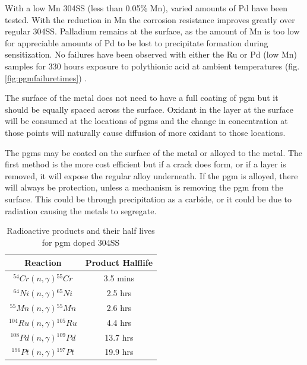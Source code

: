 With a low Mn 304SS (less than 0.05\% Mn), varied amounts of Pd have been tested.  With the reduction in Mn the corrosion resistance improves greatly over regular 304SS.  Palladium remains at the surface, as the amount of Mn is too low for appreciable amounts of Pd to be lost to precipitate formation during sensitization.  No failures have been observed with either the Ru or Pd (low Mn) samples for 330 hours exposure to polythionic acid at ambient temperatures (fig. \ref{fig:pgmfailuretimes}) \cite{scrstainless}.

The surface of the metal does not need to have a full coating of \acrshort{pgm} but it should be equally spaced across the surface.  Oxidant in the layer at the surface will be consumed at the locations of \acrshort{pgm}s and the change in concentration at those points will naturally cause diffusion of more oxidant to those locations\cite{noblemetalchemical}.

The \acrshort{pgm}s may be coated on the surface of the metal or alloyed to the metal.  The first method is the more cost efficient but if a crack does form, or if a layer is removed, it will expose the regular alloy underneath.  If the \acrshort{pgm} is alloyed, there will always be protection, unless a mechanism is removing the \acrshort{pgm} from the surface.  This could be through precipitation as a carbide, or it could be due to radiation causing the metals to segregate.

\begin{table}[h]
\begin{center}
\renewcommand{\arraystretch}{1.2}
\begin{tabular}{c c}
\hline\hline
Reaction & Product Halflife\\
\hline\hline
${}^{54}Cr(n, \gamma){}^{55}Cr$ & 3.5 mins \\ 
${}^{64}Ni(n, \gamma){}^{65}Ni$ & 2.5 hrs  \\
${}^{55}Mn(n, \gamma){}^{55}Mn$ & 2.6 hrs  \\
${}^{104}Ru(n, \gamma){}^{105}Ru$ & 4.4 hrs  \\
${}^{108}Pd(n, \gamma){}^{109}Pd$ & 13.7 hrs  \\
${}^{196}Pt(n, \gamma){}^{197}Pt$ & 19.9 hrs  \\
\hline\hline
\end{tabular}
\end{center}
\caption{Radioactive products and their half lives for \acrshort{pgm} doped 304SS}
\label{table:304ssradioactive}
\end{table}

